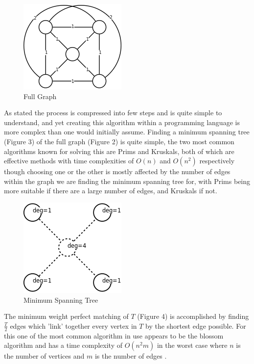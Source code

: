 \documentclass[11pt,a4paper,titlepage]{article}
\begin{document}
\begin{figure}[ht]
	\includegraphics[scale=0.75]{WikiCompleteGraph}
	\centering
	\caption{Full Graph}
\end{figure}

\clearpage
As stated the process is compressed into few steps and is quite simple to understand, and yet creating this algorithm within a programming language is more complex than one would initially assume. Finding a minimum spanning tree (Figure 3) of the full graph (Figure 2) is quite simple, the two most common algorithms known for solving this are Prims and Kruskals, both of which are effective methods with time complexities of $O(n)$ and $O(n^2)$ respectively \cite{PvKTime} though choosing one or the other is mostly affected by the number of edges within the graph we are finding the minimum spanning tree for, with Prims being more suitable if there are a large number of edges, and Kruskals if not.

\begin{figure}[ht]
	\includegraphics[scale=0.6]{WikiMinSpanTree}
	\centering
	\caption{Minimum Spanning Tree}
\end{figure}

The minimum weight perfect matching of $T$ (Figure 4) is accomplished by finding $\frac{T}{2}$ edges which 'link' together every vertex in $T$ by the shortest edge possible. For this one of the most common algorithm in use appears to be the blossom algorithm and has a time complexity of $O(n^2 m)$ in the worst case where $n$ is the number of vertices and $m$ is the number of edges \cite{BlosAlg}.
\end{document}
